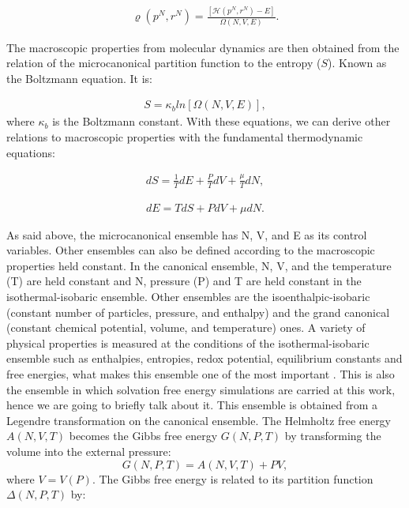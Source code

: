 \begin{equation}
\begin{aligned}
\varrho (p^{N},r^{N}) = \frac{[\mathcal{H}(p^{N},r^{N}) -E]}{ \Omega (N,V,E)} .
\end{aligned}
\end{equation}

The macroscopic properties from molecular dynamics are then obtained from the relation of the microcanonical partition function to the entropy ($S$). Known as the Boltzmann equation. It is:

\begin{equation}
\begin{aligned}
S = \kappa_{b} ln [\Omega (N,V,E)], 
\end{aligned}
\end{equation}
where $\kappa_{b}$ is the Boltzmann constant. With these equations, we can derive other relations to macroscopic properties with the fundamental thermodynamic equations:

\begin{equation}
\begin{aligned}
dS = \frac{1}{T} dE + \frac{P}{T} dV + \frac{\mu}{T} dN,
\end{aligned}
\end{equation}

\begin{equation}
\begin{aligned}
dE = T dS + P dV + \mu dN .
\end{aligned}
\end{equation}

As said above, the microcanonical ensemble  has  N, V, and E as its control variables. Other ensembles can also be defined according to the macroscopic properties held constant.  In the canonical ensemble,  N, V, and the temperature (T) are held constant and  N, pressure (P) and T are held constant in the isothermal-isobaric ensemble. Other ensembles are the isoenthalpic-isobaric (constant number of particles, pressure, and enthalpy) and the grand canonical (constant chemical potential, volume, and temperature) ones. A variety of physical properties is measured at the conditions of the isothermal-isobaric ensemble such as enthalpies, entropies, redox potential, equilibrium constants and free energies, what makes this ensemble one of the most important \cite{tuckerman}. This is also the ensemble in which solvation free energy simulations are carried at this work, hence we are going to briefly talk about it. This ensemble is obtained from a Legendre transformation on the canonical ensemble. The Helmholtz free energy $A(N,V,T)$ becomes the Gibbs free energy $G(N,P,T)$ by transforming the volume into the external pressure:
\begin{equation}
G(N,P,T) = A(N,V,T) + PV,
\end{equation}
where $V = V(P)$. The Gibbs free energy is related to its partition function $\Delta (N,P,T)$ by:

